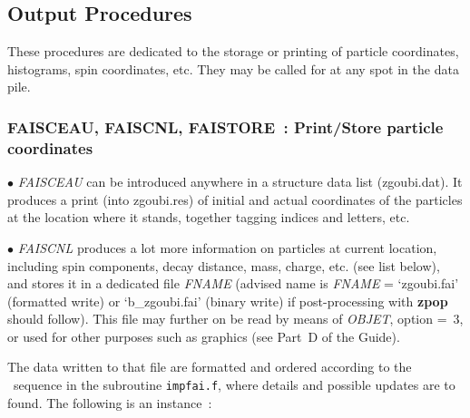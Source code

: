 \newpage  %

\subsection{Output Procedures} \label{sec4.5}

 These procedures are dedicated to the storage or printing of particle coordinates, 
histograms, spin coordinates, etc. They may be called for at any spot in the data pile. 





\newpage

\subsubsection*{FAISCEAU, FAISCNL, FAISTORE~:  Print/Store particle coordinates} \label{FAISCEAU}\label{FAISCNL}
 \label{FAISTORE} 

\medskip 


$\bullet$ \textsl{FAISCEAU}  can be introduced anywhere in a structure 
data list (zgoubi.dat).  It produces a print  (into zgoubi.res) 
of  initial and actual coordinates of the  \IMAX{} particles at the location where it stands, 
together  tagging indices and letters, etc.   

\medskip

\noindent $\bullet$  \textsl{FAISCNL} produces a lot more information on particles at current location, including 
spin components, decay distance, mass, charge, etc. (see list below), and stores it in a 
dedicated file \textsl{FNAME} (advised name is \textsl{FNAME} = `zgoubi.fai'  
(formatted write) or `b\_zgoubi.fai' (binary write) 
if post-processing with \textbf{zpop} should follow).  This file may further on be read by means of  \textsl{OBJET}, 
option \mbox{\KOBJ= 3}, or used for other purposes such as graphics (see Part~D of the Guide).  

\noindent The data written to that file are formatted and  ordered according to the \FORTRAN\ sequence 
in the subroutine \texttt{impfai.f}, where details and possible updates are to found. 
The following is an instance~: 

